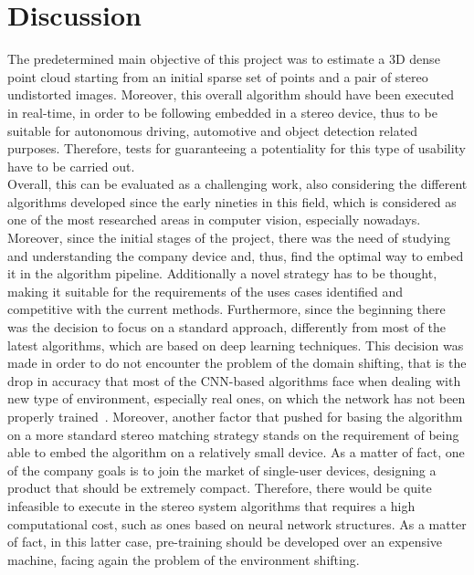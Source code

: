 \chapter{Discussion}
\label{chapter:discussion}

The predetermined main objective of this project was to estimate a 3D dense point cloud starting from an initial sparse set of points and a pair of stereo undistorted images.
Moreover, this overall algorithm should have been executed in real-time, in order to be following embedded in a stereo device, thus to be suitable for autonomous driving, automotive and object detection related purposes.
Therefore, tests for guaranteeing a potentiality for this type of usability have to be carried out. \\
Overall, this can be evaluated as a challenging work, also considering the different algorithms developed since the early nineties in this field, which is considered as one of the most researched areas in computer vision, especially nowadays.\\
Moreover, since the initial stages of the project, there was the need of studying and understanding the company device and, thus, find the optimal way to embed it in the algorithm pipeline.
Additionally a novel strategy has to be thought, making it suitable for the requirements of the uses cases identified and competitive with the current methods.
Furthermore, since the beginning there was the decision to focus on a standard approach, differently from most of the latest algorithms, which are based on deep learning techniques.  
This decision was made in order to do not encounter the problem of the domain shifting, that is the drop in accuracy that most of the CNN-based algorithms face when dealing with new type of environment, especially real ones, on which the network has not been properly trained~\cite{Poggi2019}.
Moreover, another factor that pushed for basing the algorithm on a more standard stereo matching strategy stands on the requirement of being able to embed the algorithm on a relatively small device.
As a matter of fact, one of the company goals is to join the market of single-user devices, designing a product that should be extremely compact.
Therefore, there would be quite infeasible to execute in the stereo system algorithms that requires a high computational cost, such as ones based on neural network structures.
As a matter of fact, in this latter case, pre-training should be developed over an expensive machine, facing again the problem of the environment shifting. \\
